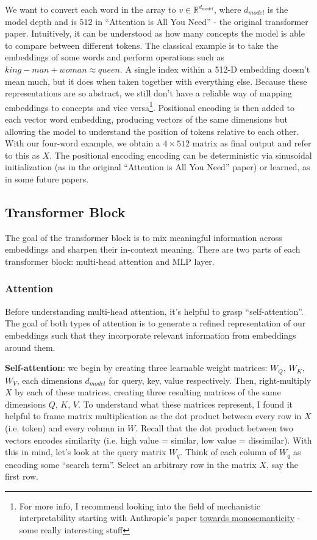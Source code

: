\documentclass[12pt]{article}
\begin{document}
We want to convert each word in the array to $v \in \mathbb{R}^{d_{model}}$, where $d_{model}$ is the model depth and is $512$ in \enquote{Attention is All You Need} - the original transformer paper. Intuitively, it can be understood as how many concepts the model is able to compare between different tokens. The classical example is to take the embeddings of some words and perform operations such as $king-man+woman\approx queen$. A single index within a 512-D embedding doesn't mean much, but it does when taken together with everything else. Because these representations are so abstract, we still don't have a reliable way of mapping embeddings to concepts and vice versa\footnote{For more info, I recommend looking into the field of mechanistic interpretability starting with Anthropic's paper \href{https://transformer-circuits.pub/2023/monosemantic-features}{towards monosemanticity} - some really interesting stuff}. Positional encoding is then added to each vector word embedding, producing vectors of the same dimensions but allowing the model to understand the position of tokens relative to each other. With our four-word example, we obtain a $4 \times 512$ matrix as final output and refer to this as $X$. The positional encoding encoding can be deterministic via sinusoidal initialization (as in the original \enquote{Attention is All You Need} paper) or learned, as in some future papers. 

\subsection{Transformer Block}

The goal of the transformer block is to mix meaningful information across embeddings and sharpen their in-context meaning. There are two parts of each transformer block: multi-head attention and MLP layer. 

\subsubsection{Attention}

Before understanding multi-head attention, it's helpful to grasp \enquote{self-attention}. The goal of both types of attention is to generate a refined representation of our embeddings such that they incorporate relevant information from embeddings around them. 

\textbf{Self-attention}: we begin by creating three learnable weight matrices: $W_Q$, $W_K$, $W_V$, each dimensions $d_{model}$ for query, key, value respectively. Then, right-multiply $X$ by each of these matrices, creating three resulting matrices of the same dimensions $Q$, $K$, $V$. To understand what these matrices represent, I found it helpful to frame matrix multiplication as the dot product between every row in $X$ (i.e. token) and every column in $W$. Recall that the dot product between two vectors encodes similarity (i.e. high value = similar, low value = dissimilar). With this in mind, let's look at the query matrix $W_q$. Think of each column of $W_q$ as encoding some \enquote{search term}. Select an arbitrary row in the matrix $X$, say the first row. 
\end{document}

